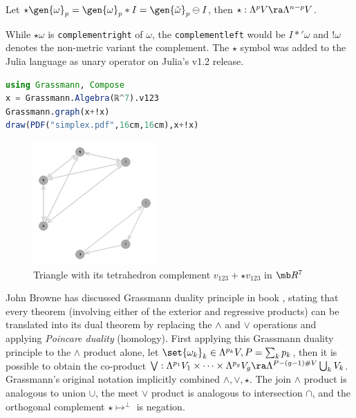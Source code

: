 \documentclass{juliacon}
\begin{document}
\begin{definition}
	Let $\star\gen{\omega}_p = \gen{\omega}_p\ast I = \gen{\tilde\omega}_p\ominus I$, %
	 then $\star : \Lambda^pV\ra\Lambda^{n-p}V$.
\end{definition}
\begin{remark}
	While $\star\omega$ is \verb`complementright` of $\omega$, the \verb`complementleft` would be $I\ast'\omega$ and $!\omega$ denotes the non-metric variant the complement. The $\star$ symbol was added to the Julia language as unary operator on Julia's v1.2 release.
\end{remark}
\begin{lstlisting}[language = Julia]
using Grassmann, Compose
x = Grassmann.Algebra(ℝ^7).v123
Grassmann.graph(x+!x)
draw(PDF("simplex.pdf",16cm,16cm),x+!x)
\end{lstlisting}
\begin{figure}[ht]
\centerline{\includegraphics[width=0.42\textwidth]{img/triangle-tetrahedron.png}}
\caption*{Triangle with its tetrahedron complement $v_{123} + \star v_{123}$ in $\mb R^7$}
\end{figure}
John Browne has discussed Grassmann duality principle in book \cite{browne}, stating that every theorem (involving either of the exterior and regressive products) can be translated into its dual theorem by replacing the $\wedge$ and $\vee$ operations and applying \textit{Poincare duality} (homology).
First applying this Grassmann duality principle to the $\wedge$ product alone, let $\set{\omega_k}_k\in\Lambda^{p_k}V, P=\sum_kp_k$, then it is possible to obtain the co-product
$\bigvee :\Lambda^{p_1}V_1\times\dots\times\Lambda^{p_g}V_g \ra \Lambda^{P-(g-1)\#V}\bigcup_k V_k$.
Grassmann's original notation implicitly combined $\wedge,\vee,\star$.
The join $\wedge$ product is analogous to union $\cup$, the meet $\vee$ product is analogous to intersection $\cap$, and the orthogonal complement $\star\mapsto^\perp$ is negation.
\end{document}
